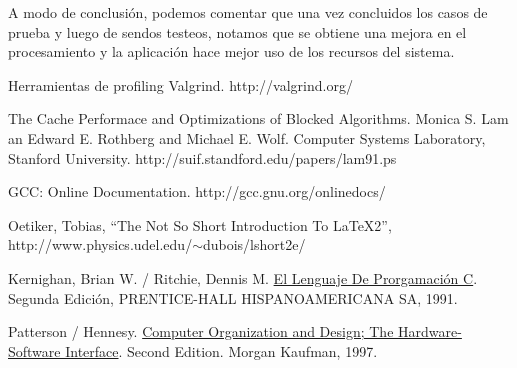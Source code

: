 \documentclass[a4paper,10pt]{article}
\begin{document}
A modo de conclusi\'on, podemos comentar que una vez concluidos los casos de prueba y luego de sendos testeos, notamos que se obtiene una mejora en el procesamiento y la aplicaci\'on hace mejor uso de los recursos del sistema.\\
\pagebreak




\begin{thebibliography}{99}

 Herramientas de profiling Valgrind. http://valgrind.org/

 The Cache Performace and Optimizations of Blocked Algorithms. Monica S. Lam an Edward E. Rothberg and Michael E. Wolf. Computer Systems Laboratory, Stanford University. http://suif.standford.edu/papers/lam91.ps

 GCC: Online Documentation. http://gcc.gnu.org/onlinedocs/

 Oetiker, Tobias, ``The Not So Short Introduction To LaTeX2'', http://www.physics.udel.edu/$\sim$dubois/lshort2e/

 Kernighan, Brian W. / Ritchie, Dennis M. \underline{El Lenguaje De Prorgamaci\'on C}. Segunda Edici\'on, PRENTICE-HALL HISPANOAMERICANA SA, 1991.

 Patterson / Hennesy. \underline{Computer Organization and Design; The Hardware-Software Interface}. Second Edition. Morgan Kaufman, 1997.

\end{thebibliography}
\end{document}
